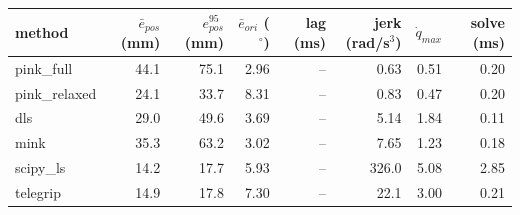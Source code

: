 \begin{tabular}{lrrrrrrr}
\toprule
method & $\bar{e}_{pos}$ (mm) & $e_{pos}^{95}$ (mm) & $\bar{e}_{ori}$ ($^\circ$) & lag (ms) & jerk (rad/s$^3$) & $\dot{q}_{max}$ & solve (ms) \\
\midrule
pink\_full & 44.1 & 75.1 & 2.96 & -- & 0.63 & 0.51 & 0.20 \\
pink\_relaxed & 24.1 & 33.7 & 8.31 & -- & 0.83 & 0.47 & 0.20 \\
dls & 29.0 & 49.6 & 3.69 & -- & 5.14 & 1.84 & 0.11 \\
mink & 35.3 & 63.2 & 3.02 & -- & 7.65 & 1.23 & 0.18 \\
scipy\_ls & 14.2 & 17.7 & 5.93 & -- & 326.0 & 5.08 & 2.85 \\
telegrip & 14.9 & 17.8 & 7.30 & -- & 22.1 & 3.00 & 0.21 \\
\bottomrule
\end{tabular}
